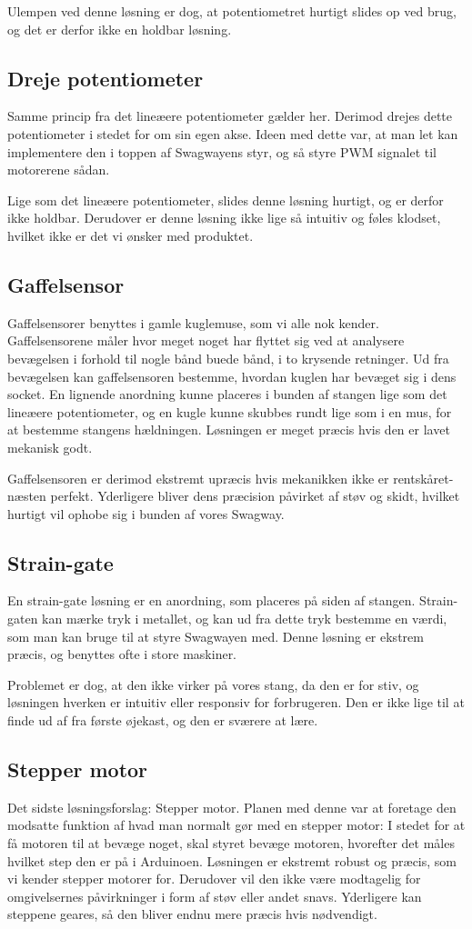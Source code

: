 \documentclass[a4paper,oneside,article,danish,table]{memoir}
\begin{document}
Ulempen ved denne løsning er dog, at potentiometret hurtigt slides op ved brug, og det er derfor ikke en holdbar løsning.
\subsection{Dreje potentiometer}
Samme princip fra det lineæere potentiometer gælder her. Derimod drejes dette potentiometer i stedet for om sin egen akse. Ideen med dette var, at man let kan implementere den i toppen af Swagwayens styr, og så styre PWM signalet til motorerene sådan. 

Lige som det lineæere potentiometer, slides denne løsning hurtigt, og er derfor ikke holdbar. Derudover er denne løsning ikke lige så intuitiv og føles klodset, hvilket ikke er det vi ønsker med produktet.
\subsection{Gaffelsensor}
Gaffelsensorer benyttes i gamle kuglemuse, som vi alle nok kender. Gaffelsensorene måler hvor meget noget har flyttet sig ved at analysere bevægelsen i forhold til nogle bånd buede bånd, i to krysende retninger. Ud fra bevægelsen kan gaffelsensoren bestemme, hvordan kuglen har bevæget sig i dens socket. En lignende anordning kunne placeres i bunden af stangen lige som det lineæere potentiometer, og en kugle kunne skubbes rundt lige som i en mus, for at bestemme stangens hældningen. Løsningen er meget præcis hvis den er lavet mekanisk godt.

Gaffelsensoren er derimod ekstremt upræcis hvis mekanikken ikke er rentskåret-næsten perfekt. Yderligere bliver dens præcision påvirket af støv og skidt, hvilket hurtigt vil ophobe sig i bunden af vores Swagway.
\subsection{Strain-gate}
En strain-gate løsning er en anordning, som placeres på siden af stangen. Strain-gaten kan mærke tryk i metallet, og kan ud fra dette tryk bestemme en værdi, som man kan bruge til at styre Swagwayen med. Denne løsning er ekstrem præcis, og benyttes ofte i store maskiner.

Problemet er dog, at den ikke virker på vores stang, da den er for stiv, og løsningen hverken er intuitiv eller responsiv for forbrugeren. Den er ikke lige til at finde ud af fra første øjekast, og den er sværere at lære.
\subsection{Stepper motor}
Det sidste løsningsforslag: Stepper motor. Planen med denne var at foretage den modsatte funktion af hvad man normalt gør med en stepper motor: I stedet for at få motoren til at bevæge noget, skal styret bevæge motoren, hvorefter det måles hvilket step den er på i Arduinoen. Løsningen er ekstremt robust og præcis, som vi kender stepper motorer for. Derudover vil den ikke være modtagelig for omgivelsernes påvirkninger i form af støv eller andet snavs. Yderligere kan steppene geares, så den bliver endnu mere præcis hvis nødvendigt.
\end{document}
